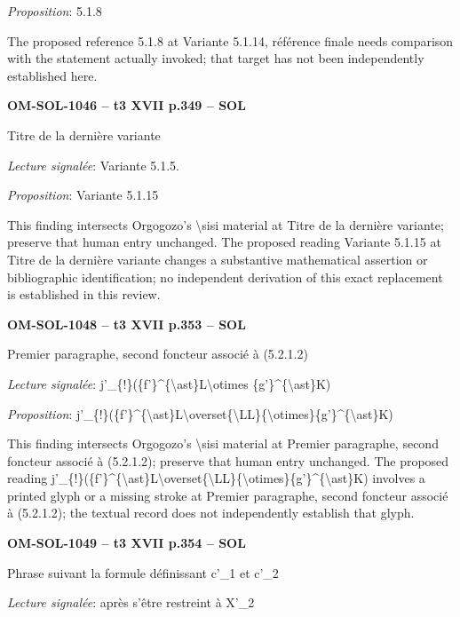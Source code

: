 \emph{Proposition}: 5.1.8\par
The proposed reference 5.1.8 at Variante 5.1.14, référence finale needs comparison with the statement actually invoked; that target has not been independently established here.\par
\par\noindent\textbf{OM-SOL-1046 -- t3 XVII p.349 -- SOL}\par
Titre de la dernière variante\par
\emph{Lecture signalée}: Variante 5.1.5.\par
\emph{Proposition}: Variante 5.1.15\par
This finding intersects Orgogozo's \textbackslash{}sisi material at Titre de la dernière variante; preserve that human entry unchanged. The proposed reading Variante 5.1.15 at Titre de la dernière variante changes a substantive mathematical assertion or bibliographic identification; no independent derivation of this exact replacement is established in this review.\par
\par\noindent\textbf{OM-SOL-1048 -- t3 XVII p.353 -- SOL}\par
Premier paragraphe, second foncteur associé à (5.2.1.2)\par
\emph{Lecture signalée}: j'\_\{!\}(\{f'\}\textasciicircum{}\{\textbackslash{}ast\}L\textbackslash{}otimes \{g'\}\textasciicircum{}\{\textbackslash{}ast\}K)\par
\emph{Proposition}: j'\_\{!\}(\{f'\}\textasciicircum{}\{\textbackslash{}ast\}L\textbackslash{}overset\{\textbackslash{}LL\}\{\textbackslash{}otimes\}\{g'\}\textasciicircum{}\{\textbackslash{}ast\}K)\par
This finding intersects Orgogozo's \textbackslash{}sisi material at Premier paragraphe, second foncteur associé à (5.2.1.2); preserve that human entry unchanged. The proposed reading j'\_\{!\}(\{f'\}\textasciicircum{}\{\textbackslash{}ast\}L\textbackslash{}overset\{\textbackslash{}LL\}\{\textbackslash{}otimes\}\{g'\}\textasciicircum{}\{\textbackslash{}ast\}K) involves a printed glyph or a missing stroke at Premier paragraphe, second foncteur associé à (5.2.1.2); the textual record does not independently establish that glyph.\par
\par\noindent\textbf{OM-SOL-1049 -- t3 XVII p.354 -- SOL}\par
Phrase suivant la formule définissant c'\_1 et c'\_2\par
\emph{Lecture signalée}: après s'être restreint à X'\_2\par
